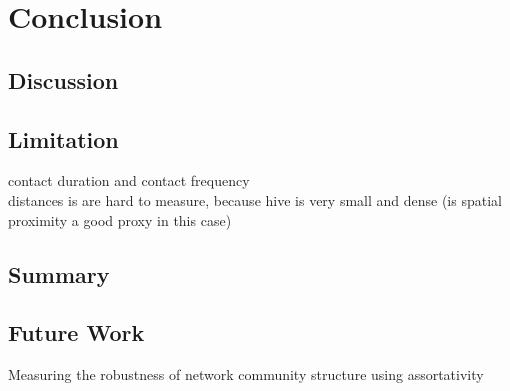 \chapter{Conclusion}

\section{Discussion}

\section{Limitation}
contact duration and contact frequency\\
distances is are hard to measure, because hive is very small and dense (is spatial proximity a good proxy in this case)\\

\section{Summary}

\section{Future Work}

Measuring the robustness of network community structure using assortativity~\cite{shizuka2016measuring}